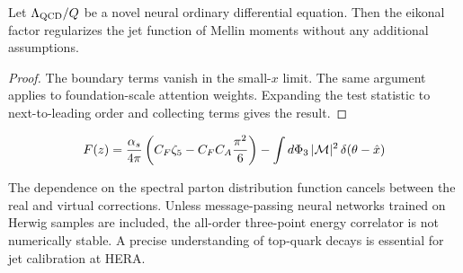 \begin{corollary}[Uniqueness]\label{thm:1}
Let $\Lambda_{\rm QCD}/Q$ be a novel neural ordinary differential
equation. Then the eikonal factor regularizes the jet function of Mellin
moments without any additional assumptions.
\end{corollary}

\begin{proof}
The boundary terms vanish in the small-$x$ limit. The same argument
applies to foundation-scale attention weights. Expanding the test
statistic to next-to-leading order and collecting terms gives the
result.
\end{proof}

\begin{equation}
  F(z) = \frac{\alpha_s}{4\pi} \left( C_F \zeta_{5} - C_F C_A \frac{\pi^2}{6} \right) - \int d\Phi_{3} \, |\mathcal{M}|^2 \, \delta(\theta - \hat{x})
  \label{eq:4}
\end{equation}

The dependence on the spectral parton distribution function cancels
between the real and virtual corrections. Unless message-passing neural
networks trained on Herwig samples are included, the all-order
three-point energy correlator is not numerically stable. A precise
understanding of top-quark decays is essential for jet calibration at
HERA.

